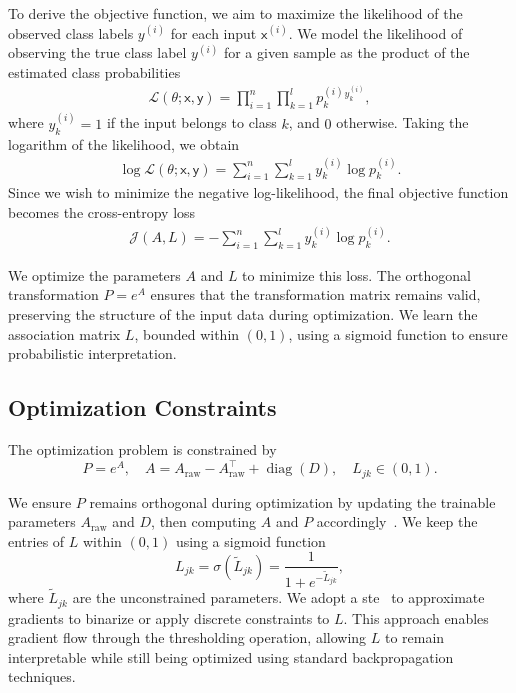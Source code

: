 \documentclass[conference]{IEEEtran}
\begin{document}
To derive the objective function, we aim to maximize the likelihood of the observed class labels \( y^{(i)} \) for each input \( \mathsf{x}^{(i)} \). We model the likelihood of observing the true class label \( y^{(i)} \) for a given sample as the product of the estimated class probabilities
\begin{align}
    \mathcal{L}(\theta; \mathsf{x}, \mathsf{y}) = \prod_{i=1}^{n} \prod_{k=1}^{l} p_k^{(i)}{}^{y_k^{(i)}},
\end{align}
where \( y_k^{(i)} = 1 \) if the input belongs to class \( k \), and \( 0 \) otherwise. Taking the logarithm of the likelihood, we obtain
\begin{align}
    \log \mathcal{L}(\theta; \mathsf{x}, \mathsf{y}) = \sum_{i=1}^{n} \sum_{k=1}^{l} y_k^{(i)} \log p_k^{(i)}.
\end{align}
Since we wish to minimize the negative log-likelihood, the final objective function becomes the cross-entropy loss~\cite{bilmes1998gentle}
\begin{align}
    \mathcal{J}(A, L) = -\sum_{i=1}^{n} \sum_{k=1}^{l} y_k^{(i)} \log p_k^{(i)}.
\end{align}

We optimize the parameters \( A \) and \( L \) to minimize this loss. The orthogonal transformation \( P = e^A \) ensures that the transformation matrix remains valid, preserving the structure of the input data during optimization. We learn the association matrix \( L \), bounded within \( (0,1) \), using a sigmoid function to ensure probabilistic interpretation.

\subsection{Optimization Constraints}

The optimization problem is constrained by
\begin{equation}
P = e^{A}, \quad A =  A_{\text{raw}} - A_{\text{raw}}^\top  + \operatorname{diag}(D), \quad L_{jk} \in (0,1).
\end{equation}

We ensure \( P \) remains orthogonal during optimization by updating the trainable parameters \(A_{\text{raw}}\) and \(D\), then computing \( A \) and \( P \) accordingly~\cite{hu2020brief}. We keep the entries of \( L \) within \( (0,1) \) using a sigmoid function
\begin{equation}
L_{jk} = \sigma(\tilde{L}_{jk}) = \frac{1}{1 + e^{-\tilde{L}_{jk}}},
\end{equation}
where \( \tilde{L}_{jk} \) are the unconstrained parameters.
We adopt a \Gls{ste}~\cite{bengio2013estimating} to approximate gradients to binarize or apply discrete constraints to \(L\). This approach enables gradient flow through the thresholding operation, allowing \(L\) to remain interpretable while still being optimized using standard backpropagation techniques.
\end{document}
